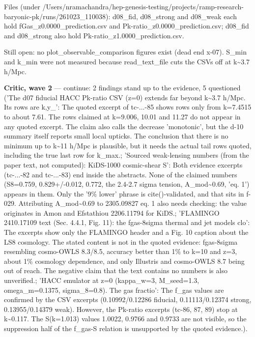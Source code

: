 \documentclass[11pt,a4paper]{article}
\begin{document}
Files (under /Users/nramachandra/hep-genesis-testing/projects/ramp-research-baryonic-pk/runs/261023\_110038): d08\_fid, d08\_strong and d08\_weak each hold fGas\_z0.0000\_prediction.csv and Pk-ratio\_z0.0000\_prediction.csv; d08\_fid and d08\_strong also hold Pk-ratio\_z1.0000\_prediction.csv.

Still open: no plot\_observable\_comparison figures exist (dead end x-07). S\_min and k\_min were not measured because read\_text\_file cuts the CSVs off at k\textasciitilde{}3.7 h/Mpc.

\textbf{Critic, wave 2} --- continue: 2 findings stand up to the evidence, 5 questioned ('The d07 fiducial HACC Pk-ratio CSV (z=0) extends far beyond k\textasciitilde{}3.7 h/Mpc. Its rows are k,y\_': The quoted excerpt of tc-...-85 shows rows only from k=7.4515 to about 7.61. The rows claimed at k=9.006, 10.01 and 11.27 do not appear in any quoted excerpt. The claim also calls the decrease 'monotonic', but the d-10 summary itself reports small local upticks. The conclusion that there is no minimum up to k\textasciitilde{}11 h/Mpc is plausible, but it needs the actual tail rows quoted, including the true last row for k\_max.; 'Sourced weak-lensing numbers (from the paper text, not computed): KiDS-1000 cosmic-shear S': Both evidence excerpts (tc-...-82 and tc-...-83) end inside the abstracts. None of the claimed numbers (S8=0.759, 0.829+/-0.012, 0.772, the 2.4-2.7 sigma tension, A\_mod\textasciitilde{}0.69, 'eq. 1') appears in them. Only the '9\% lower' phrase is cite()-validated, and that sits in f-029. Attributing A\_mod\textasciitilde{}0.69 to 2305.09827 eq. 1 also needs checking: the value originates in Amon and Efstathiou 2206.11794 for KiDS.; 'FLAMINGO 2410.17109 text (Sec. 4.4.1, Fig. 11): the fgas-8sigma thermal and jet models clo': The excerpts show only the FLAMINGO header and a Fig. 10 caption about the LS8 cosmology. The stated content is not in the quoted evidence: fgas-8sigma resembling cosmo-OWLS 8.3/8.5, accuracy better than 1\% to k=10 and z=3, about 1\% cosmology dependence, and only Illustris and cosmo-OWLS 8.7 being out of reach. The negative claim that the text contains no numbers is also unverified.; 'HACC emulator at z=0 (kappa\_w=3, M\_seed=1.3, omega\_m=0.1375, sigma\_8=0.8). The gas fractio': The f\_gas values are confirmed by the CSV excerpts (0.10992/0.12286 fiducial, 0.11113/0.12374 strong, 0.13955/0.14379 weak). However, the Pk-ratio excerpts (tc-86, 87, 89) stop at k\textasciitilde{}0.117. The S(k=1.013) values 1.0022, 0.9766 and 0.9733 are not visible, so the suppression half of the f\_gas-S relation is unsupported by the quoted evidence.).
\end{document}
